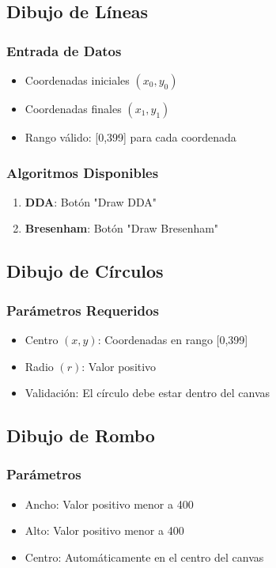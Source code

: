 \documentclass[12pt]{article}
\begin{document}
\subsection{Dibujo de Líneas}
\subsubsection{Entrada de Datos}
\begin{itemize}
    \item Coordenadas iniciales $(x_0,y_0)$
    \item Coordenadas finales $(x_1,y_1)$
    \item Rango válido: [0,399] para cada coordenada
\end{itemize}

\subsubsection{Algoritmos Disponibles}
\begin{enumerate}
    \item \textbf{DDA}: Botón "Draw DDA"
    \item \textbf{Bresenham}: Botón "Draw Bresenham"
\end{enumerate}

\subsection{Dibujo de Círculos}
\subsubsection{Parámetros Requeridos}
\begin{itemize}
    \item Centro $(x,y)$: Coordenadas en rango [0,399]
    \item Radio $(r)$: Valor positivo
    \item Validación: El círculo debe estar dentro del canvas
\end{itemize}

\subsection{Dibujo de Rombo}
\subsubsection{Parámetros}
\begin{itemize}
    \item Ancho: Valor positivo menor a 400
    \item Alto: Valor positivo menor a 400
    \item Centro: Automáticamente en el centro del canvas
\end{itemize}
\end{document}
